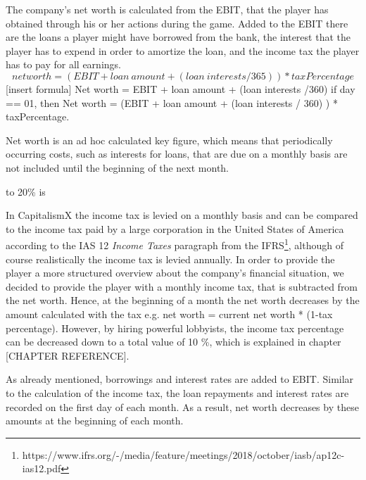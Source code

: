 The company’s net worth is calculated from the EBIT, that the player has obtained through his or her actions during the game. Added to the EBIT there are the loans a player might have borrowed from the bank, the interest that the player has to expend in order to amortize the loan, and the income tax the player has to pay for all earnings. \\
$$net worth= (EBIT+loan\ amount+(loan\ interests/365))* taxPercentage$$
[insert formula]
Net worth = EBIT + loan amount + (loan interests /360) if day == 01, then Net worth = (EBIT + loan amount + (loan interests / 360) ) * taxPercentage.

Net worth is an ad hoc calculated key figure, which means that periodically occurring costs, such as interests for loans, that are due on a monthly basis are not included until the beginning of the next month. 

 to 20\% is
 
 
In CapitalismX the income tax is levied on a monthly basis and can be compared to the income tax paid by a large corporation in the United States of America according to the IAS 12 \textit{Income Taxes} paragraph from the IFRS\footnote{https://www.ifrs.org/-/media/feature/meetings/2018/october/iasb/ap12c-ias12.pdf}, although of course realistically the income tax is levied annually. In order to provide the player a more structured overview about the company’s financial situation, we decided to provide the player with a monthly income tax, that is subtracted from the net worth. Hence, at the beginning of a month the net worth decreases by the amount calculated with the tax e.g. net worth = current net worth * (1-tax percentage). However, by hiring powerful lobbyists, the income tax percentage can be decreased down to a total value of 10 \%, which is explained in chapter [CHAPTER REFERENCE].

As already mentioned, borrowings and interest rates are added to EBIT. Similar to the calculation of the income tax, the loan repayments and interest rates are recorded on the first day of each month. As a result, net worth decreases by these amounts at the beginning of each month.

